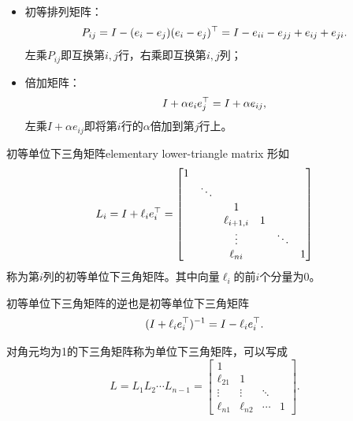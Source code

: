 \begin{example}
    {}{}
    \begin{itemize}
        \item 初等排列矩阵：
        \begin{equation}\label{eq:na-elementary-permutation}
            P_{ij} = I - (e_i - e_j)(e_i - e_j)^\top = I - e_{ii} - e_{jj} + e_{ij} + e_{ji}.
        \end{equation}
        左乘$P_{ij}$即互换第$i,j$行，右乘即互换第$i,j$列；
        \item 倍加矩阵：
        \begin{equation}\label{eq:na-elementary-row-addition}
            I + \alpha e_ie_j^\top = I + \alpha e_{ij},
        \end{equation}
        左乘$I + \alpha e_{ij}$即将第$i$行的$\alpha$倍加到第$j$行上。
    \end{itemize}
\end{example}

\begin{definition}
    {初等单位下三角矩阵}{elementary lower-triangle matrix}
    形如
    \begin{equation}
        L_i = I + \ell_ie_i^\top = \begin{bmatrix}
            1\\ &\ddots\\ &&1\\ &&\ell_{i+1,i}&1\\ &&\vdots&&\ddots\\ &&\ell_{ni}&&&1
        \end{bmatrix}
    \end{equation}
    称为第$i$列的初等单位下三角矩阵。其中向量$\ell_i$的前$i$个分量为0。
\end{definition}

\begin{corollary}
    初等单位下三角矩阵的逆也是初等单位下三角矩阵
    \begin{equation}
        (I + \ell_ie_i^\top)^{-1} = I - \ell_ie_i^\top.
    \end{equation}
\end{corollary}

\begin{corollary}
    对角元均为1的下三角矩阵称为单位下三角矩阵，可以写成
    \[
        L = L_1L_2\cdots L_{n-1} = \begin{bmatrix}
            1\\\ell_{21}&1\\ \vdots&\vdots&\ddots\\
            \ell_{n1}&\ell_{n2}&\cdots&1
        \end{bmatrix}.
    \]
\end{corollary}

